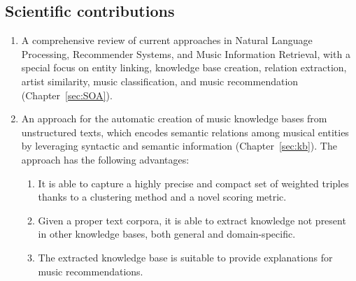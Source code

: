 \subsection{Scientific contributions}

\begin{enumerate}

\item 
A comprehensive review of current approaches in Natural Language Processing, Recommender Systems, and Music Information Retrieval, with a special focus on entity linking, knowledge base creation, relation extraction, artist similarity, music classification, and music recommendation (Chapter~\ref{sec:SOA}).


\item 
An approach for the automatic creation of music knowledge bases from unstructured texts, which encodes semantic relations among musical entities by leveraging syntactic and semantic information (Chapter~\ref{sec:kb}). %
The approach has the following advantages:

\begin{enumerate}
\item 
It is able to capture a highly precise and compact set of weighted triples thanks to a clustering method and a novel scoring metric. 
\item 
Given a proper text corpora, it is able to extract knowledge not present in other knowledge bases, both general and domain-specific. 
\item
The extracted knowledge base is suitable to provide explanations for music recommendations.
\end{enumerate}


\end{enumerate}
